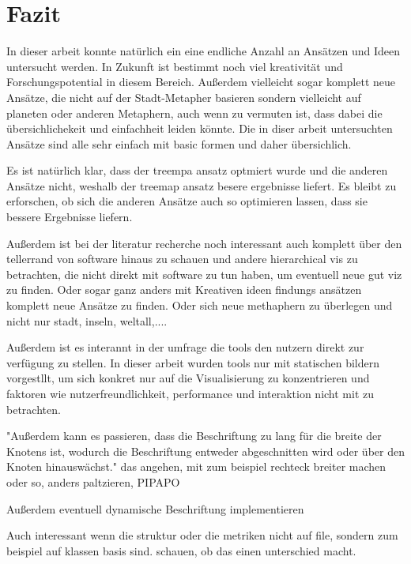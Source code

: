 \section{Fazit} \label{sec:Fazit}
In dieser arbeit konnte natürlich ein eine endliche Anzahl an Ansätzen und Ideen untersucht werden. In Zukunft ist bestimmt noch viel kreativität und Forschungspotential in diesem Bereich. Außerdem vielleicht sogar komplett neue Ansätze, die nicht auf der Stadt-Metapher basieren sondern vielleicht auf planeten oder anderen Metaphern, auch wenn zu vermuten ist, dass dabei die übersichlichekeit und einfachheit leiden könnte. Die in diser arbeit untersuchten Ansätze sind alle sehr einfach mit basic formen und daher übersichlich.


Es ist natürlich klar, dass der treempa ansatz optmiert wurde und die anderen Ansätze nicht, weshalb der treemap ansatz besere ergebnisse liefert. 
Es bleibt zu erforschen, ob sich die anderen Ansätze auch so optimieren lassen, dass sie bessere Ergebnisse liefern.


Außerdem ist bei der literatur recherche noch interessant auch komplett über den tellerrand von software hinaus zu schauen und andere hierarchical vis zu betrachten, die nicht direkt mit software zu tun haben, um eventuell neue gut viz zu finden. Oder sogar ganz anders mit Kreativen ideen findungs ansätzen komplett neue Ansätze zu finden. Oder sich neue methaphern zu überlegen und nicht nur stadt, inseln, weltall,....

Außerdem ist es interannt in der umfrage die tools den nutzern direkt zur verfügung zu stellen. In dieser arbeit wurden tools nur mit statischen bildern vorgestllt, um sich konkret nur auf die Visualisierung zu konzentrieren und faktoren wie nutzerfreundlichkeit, performance und interaktion nicht mit zu betrachten.

"Außerdem kann es passieren, dass die Beschriftung zu lang für die breite der Knotens ist, wodurch die Beschriftung entweder abgeschnitten wird oder über den Knoten hinauswächst." das angehen, mit zum beispiel rechteck breiter machen oder so, anders paltzieren, PIPAPO

Außerdem eventuell dynamische Beschriftung implementieren


Auch interessant wenn die struktur oder die metriken nicht auf file, sondern zum beispiel auf klassen basis sind. schauen, ob das einen unterschied macht.